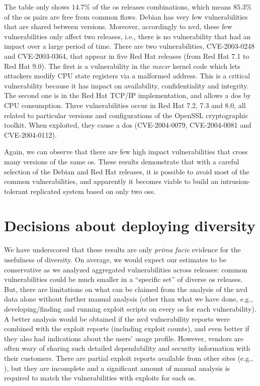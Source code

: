 The table only shows $14.7\%$ of the \gls{os} releases combinations, which means $85.3\%$ of the \gls{os} pairs are free from common flaws. 
Debian has very few vulnerabilities that are shared between versions. 
Moreover, accordingly to \gls{nvd}, these few vulnerabilities only affect two releases, i.e., there is no vulnerability that had an impact over a large period of time. 
There are two vulnerabilities, CVE-2003-0248 and CVE-2003-0364, that appear in five Red Hat releases (from Red Hat 7.1 to Red Hat 9.0). 
The first is a vulnerability in the \emph{mxcsr} kernel code which lets attackers modify CPU state registers via a malformed address. 
This is a critical vulnerability because it has impact on availability, confidentiality and integrity. 
The second one is in the Red Hat TCP/IP implementation, and allows a \gls{dos} by CPU consumption. 
Three vulnerabilities occur in Red Hat 7.2, 7.3 and 8.0, all related to particular versions and configurations of the OpenSSL cryptographic toolkit. 
When exploited, they cause a \gls{dos} (CVE-2004-0079, CVE-2004-0081 and CVE-2004-0112).

Again, we can observe that there are few high impact vulnerabilities that cross many versions of the same \gls{os}. 
These results demonstrate that with a careful selection of the Debian and Red Hat releases, it is possible to avoid most of the common vulnerabilities, and apparently it becomes viable to build an intrusion-tolerant replicated system based on only two \glspl{os}.


\section{Decisions about deploying diversity}\label{decisions}
We have underscored that these results are only \textit{prima facie} evidence for the usefulness of diversity. 
On average, we would expect our estimates to be conservative as we analyzed aggregated vulnerabilities across releases: common vulnerabilities could be much smaller in a ``specific set'' of diverse \gls{os} releases. 
But, there are limitations on what can be claimed from the analysis of the \gls{nvd} data alone without further manual analysis (other than what we have done, e.g., developing/finding and running exploit scripts on every \gls{os} for each vulnerability).
A better analysis would be obtained if the \gls{nvd} vulnerability reports were combined with the exploit reports (including exploit counts), and even better if they also had indications about the users' usage profile.
However, vendors are often wary of sharing such detailed dependability and security information with their customers.
There are partial exploit reports available from other sites (e.g., \cite{cvedetails}), but they are incomplete and a significant amount of manual analysis is required to match the vulnerabilities with exploits for each \gls{os}.


